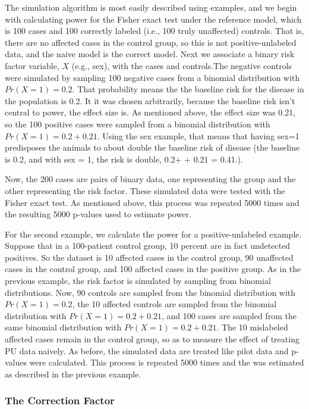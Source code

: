 \documentclass[
]{article}
\begin{document}
The simulation algorithm is most easily described using examples, and we
begin with calculating power for the Fisher exact test under the
reference model, which is 100 cases and 100 correctly labeled (i.e., 100
truly unaffected) controls. That is, there are no affected cases in the
control group, so this is not positive-unlabeled data, and the naive
model is the correct model. Next we associate a binary risk factor
variable, \(X\) (e.g., sex), with the cases and controls.The negative
controls were simulated by sampling 100 negative cases from a binomial
distribution with \(Pr(X=1) = 0.2\). That probability means the the
baseline risk for the disease in the population is 0.2. It it was chosen
arbitrarily, because the baseline risk isn't central to power, the
effect size is. As mentioned above, the effect size was 0.21, so the 100
positive cases were sampled from a binomial distribution with
\(Pr(X=1) = 0.2 + 0.21\). Using the sex example, that means that having
sex=1 predisposes the animals to about double the baseline risk of
disease (the baseline is 0.2, and with sex = 1, the risk is double, 0.2+
+ 0.21 = 0.41.).

Now, the 200 cases are pairs of binary data, one representing the group
and the other representing the risk factor. These simulated data were
tested with the Fisher exact test. As mentioned above, this process was
repeated 5000 times and the resulting 5000 p-values used to estimate
power.

For the second example, we calculate the power for a positive-unlabeled
example. Suppose that in a 100-patient control group, 10 percent are in
fact undetected positives. So the dataset is 10 affected cases in the
control group, 90 unaffected cases in the control group, and 100
affected cases in the positive group. As in the previous example, the
risk factor is simulated by sampling from binomial distributions. Now,
90 controls are sampled from the binomial distribution with
\(Pr(X=1) = 0.2\), the 10 affected controls are sampled from the
binomial distribution with \(Pr(X=1) = 0.2+ 0.21\), and 100 cases are
sampled from the same binomial distribution with
\(Pr(X=1) = 0.2 + 0.21\). The 10 mislabeled affected cases remain in the
control group, so as to measure the effect of treating PU data naively.
As before, the simulated data are treated like pilot data and p-values
were calculated. This process is repeated 5000 times and the was
estimated as described in the previous example.

\hypertarget{the-correction-factor}{%
\subsubsection{The Correction Factor}\label{the-correction-factor}}
\end{document}
